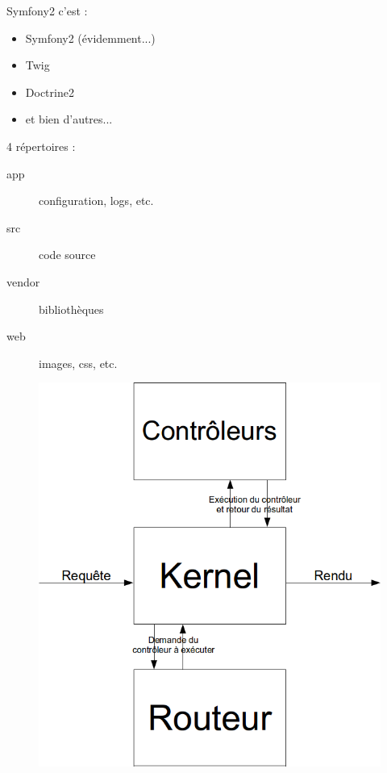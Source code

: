 \begin{frame}
  Symfony2 c'est :
  \begin{itemize}
  \item Symfony2 (évidemment...)
  \item Twig
  \item Doctrine2
  \item et bien d'autres...
  \end{itemize}
\end{frame}

\begin{frame}
  4 répertoires :
  \begin{description}
    \item[app] configuration, logs, etc.
    \item[src] code source
    \item[vendor] bibliothèques
    \item[web] images, css, etc.
  \end{description}
\end{frame}

\begin{frame}
   \begin{figure}
    \includegraphics[scale=0.25]{img/fonctionnement.png}
  \end{figure}  
\end{frame}

